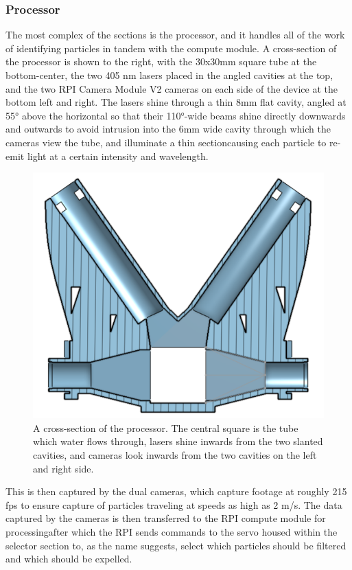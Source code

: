 \documentclass[fleqn,10pt]{SelfArx} %
\begin{document}
	\subsubsection{Processor}
	The most complex of the sections is the processor, and it handles all of the work of identifying particles in tandem with the compute module. A cross-section of the processor is shown to the right, with the 30x30mm square tube at the bottom-center, the two 405 nm lasers placed in the angled cavities at the top, and the two RPI Camera Module V2 cameras on each side of the device at the bottom left and right. The lasers shine through a thin 8mm flat cavity, angled at 55° above the horizontal so that their 110°-wide beams shine directly downwards and outwards to avoid intrusion into the 6mm wide cavity through which the cameras view the tube, and illuminate a thin section\textemdash causing each particle to re-emit light at a certain intensity and wavelength. 
	\begin{figure}[h]
		\centering
		\includegraphics[width=1\linewidth]{Figures/ProcessorCrosssection}
		\caption[Processor Cross-section]{A cross-section of the processor. The central square is the tube which water flows through, lasers shine inwards from the two slanted cavities, and cameras look inwards from the two cavities on the left and right side.}
		\label{fig:ProcessorCrosssec}
	\end{figure}
	This is then captured by the dual cameras, which capture footage at roughly 215 fps to ensure capture of particles traveling at speeds as high as 2 m/s. The data captured by the cameras is then transferred to the RPI compute module for processing\textemdash after which the RPI sends commands to the servo housed within the selector section to, as the name suggests, select which particles should be filtered and which should be expelled. 
\end{document}

